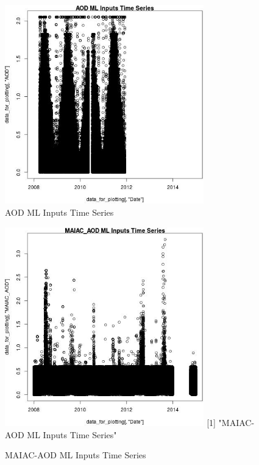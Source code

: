 \begin{figure} 
\centering  
\includegraphics[width=0.77\textwidth]{Code_Outputs/ML_input_report_ML_input_PM25_Step5_part_d_de_duplicated_aves_ML_input_AODTS.jpg} 
\caption{\label{fig:ML_input_report_ML_input_PM25_Step5_part_d_de_duplicated_aves_ML_inputAODTS}AOD ML Inputs Time Series} 
\end{figure} 
 

\begin{figure} 
\centering  
\includegraphics[width=0.77\textwidth]{Code_Outputs/ML_input_report_ML_input_PM25_Step5_part_d_de_duplicated_aves_ML_input_MAIAC_AODTS.jpg} 
[1] "MAIAC-AOD ML Inputs Time Series"
\caption{\label{fig:ML_input_report_ML_input_PM25_Step5_part_d_de_duplicated_aves_ML_inputMAIAC_AODTS}MAIAC-AOD ML Inputs Time Series} 
\end{figure} 
 

